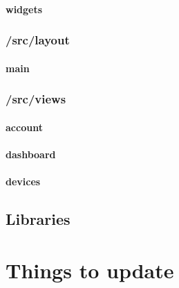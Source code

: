 \documentclass[12pt, titlepage]{article}
\begin{document}
    \paragraph{widgets}

\subsubsection{/src/layout}
    \paragraph{main}

\subsubsection{/src/views}
    \paragraph{account}

    \paragraph{dashboard}

    \paragraph{devices}

\subsection{Libraries}


\section{Things to update}
\end{document}

